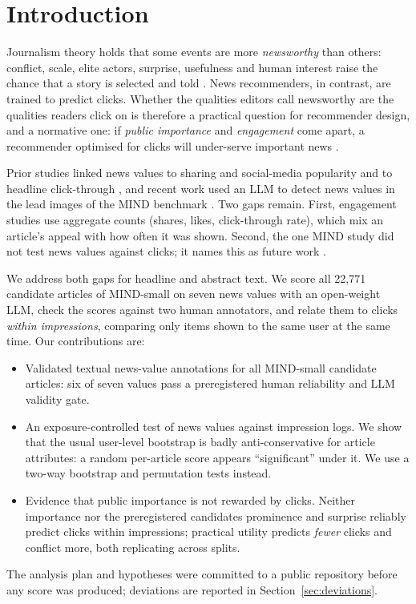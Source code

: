
\section{Introduction}
Journalism theory holds that some events are more \emph{newsworthy} than others: conflict, scale, elite actors, surprise, usefulness and human interest raise the chance that a story is selected and told \cite{galtung1965,harcup2017}. News recommenders, in contrast, are trained to predict clicks. Whether the qualities editors call newsworthy are the qualities readers click on is therefore a practical question for recommender design, and a normative one: if \emph{public importance} and \emph{engagement} come apart, a recommender optimised for clicks will under-serve important news \cite{meese2025,vrijenhoek2023}.

Prior studies linked news values to sharing and social-media popularity \cite{trilling2017,piotrkowicz2017} and to headline click-through \cite{lagerwerf2021}, and recent work used an LLM to detect news values in the lead images of the MIND benchmark \cite{sotic2025}. Two gaps remain. First, engagement studies use aggregate counts (shares, likes, click-through rate), which mix an article's appeal with how often it was shown. Second, the one MIND study did not test news values against clicks; it names this as future work \cite{sotic2025}.

We address both gaps for headline and abstract text. We score all 22,771 candidate articles of MIND-small \cite{wu2020mind} on seven news values with an open-weight LLM, check the scores against two human annotators, and relate them to clicks \emph{within impressions}, comparing only items shown to the same user at the same time. Our contributions are:
\begin{itemize}
\item Validated textual news-value annotations for all MIND-small candidate articles: six of seven values pass a preregistered human reliability and LLM validity gate.
\item An exposure-controlled test of news values against impression logs. We show that the usual user-level bootstrap is badly anti-conservative for article attributes: a random per-article score appears ``significant'' under it. We use a two-way bootstrap and permutation tests instead.
\item Evidence that public importance is not rewarded by clicks. Neither importance nor the preregistered candidates prominence and surprise reliably predict clicks within impressions; practical utility predicts \emph{fewer} clicks and conflict more, both replicating across splits.
\end{itemize}
The analysis plan and hypotheses were committed to a public repository before any score was produced; deviations are reported in Section~\ref{sec:deviations}.

